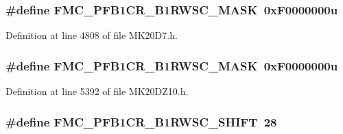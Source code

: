 \subsubsection[{\texorpdfstring{F\+M\+C\+\_\+\+P\+F\+B1\+C\+R\+\_\+\+B1\+R\+W\+S\+C\+\_\+\+M\+A\+SK}{FMC_PFB1CR_B1RWSC_MASK}}]{\setlength{\rightskip}{0pt plus 5cm}\#define F\+M\+C\+\_\+\+P\+F\+B1\+C\+R\+\_\+\+B1\+R\+W\+S\+C\+\_\+\+M\+A\+SK~0x\+F0000000u}\hypertarget{group___f_m_c___register___masks_ga3ab917a9071f70118eaabd80f2ec08e4}{}\label{group___f_m_c___register___masks_ga3ab917a9071f70118eaabd80f2ec08e4}


Definition at line 4808 of file M\+K20\+D7.\+h.

\subsubsection[{\texorpdfstring{F\+M\+C\+\_\+\+P\+F\+B1\+C\+R\+\_\+\+B1\+R\+W\+S\+C\+\_\+\+M\+A\+SK}{FMC_PFB1CR_B1RWSC_MASK}}]{\setlength{\rightskip}{0pt plus 5cm}\#define F\+M\+C\+\_\+\+P\+F\+B1\+C\+R\+\_\+\+B1\+R\+W\+S\+C\+\_\+\+M\+A\+SK~0x\+F0000000u}\hypertarget{group___f_m_c___register___masks_ga3ab917a9071f70118eaabd80f2ec08e4}{}\label{group___f_m_c___register___masks_ga3ab917a9071f70118eaabd80f2ec08e4}


Definition at line 5392 of file M\+K20\+D\+Z10.\+h.

\subsubsection[{\texorpdfstring{F\+M\+C\+\_\+\+P\+F\+B1\+C\+R\+\_\+\+B1\+R\+W\+S\+C\+\_\+\+S\+H\+I\+FT}{FMC_PFB1CR_B1RWSC_SHIFT}}]{\setlength{\rightskip}{0pt plus 5cm}\#define F\+M\+C\+\_\+\+P\+F\+B1\+C\+R\+\_\+\+B1\+R\+W\+S\+C\+\_\+\+S\+H\+I\+FT~28}\hypertarget{group___f_m_c___register___masks_ga72daab1c5e2db3b1e521590edc2a153a}{}\label{group___f_m_c___register___masks_ga72daab1c5e2db3b1e521590edc2a153a}


